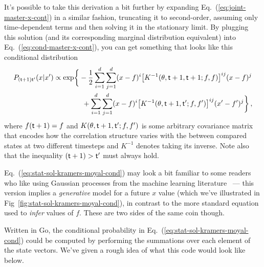 It's possible to take this derivation a bit further by expanding Eq.~(\ref{eq:joint-master-x-cont}) in a similar fashion, truncating it to second-order, assuming only time-dependent terms and then solving it in the stationary limit. By plugging this solution (and its corresponding marginal distribution equivalent) into Eq.~(\ref{eq:cond-master-x-cont}), you can get something that looks like this conditional distribution
\begin{align}
P_{({\sf t}+1){\sf t}'}(x\vert x') &\propto {\rm exp}\bigg\{ -\frac{1}{2}\sum^d_{i=1}\sum^d_{j=1}(x-f)^i \big[K^{-1}(\theta , {\sf t}+1,{\sf t}+1; f,f)\big]^{ij}(x-f)^j \nonumber \\
& \qquad \qquad + \sum^d_{i=1}\sum^d_{j=1}(x-f)^i \big[ K^{-1}(\theta , {\sf t}+1,{\sf t}'; f,f')\big]^{ij}(x'-f')^j  \bigg\} \label{eq:stat-sol-kramers-moyal-cond}\,,
\end{align}
where $f({\sf t}+1)=f$ and $K(\theta , {\sf t}+1,{\sf t}'; f,f')$ is some arbitrary covariance matrix that encodes how the correlation structure varies with the between compared states at two different timesteps and $K^{-1}$ denotes taking its inverse. Note also that the inequality $({\sf t}+1)>{\sf t}'$ must always hold.

Eq.~(\ref{eq:stat-sol-kramers-moyal-cond}) may look a bit familiar to some readers who like using Gaussian processes from the machine learning literature~\cite{murphy2012machine} --- this version implies a \emph{generative} model for a future $x$ value (which we've illustrated in Fig~\ref{fig:stat-sol-kramers-moyal-cond}), in contrast to the more standard equation used to \emph{infer} values of $f$. These are two sides of the same coin though. 

Written in Go, the conditional probability in Eq.~(\ref{eq:stat-sol-kramers-moyal-cond}) could be computed by performing the summations over each element of the state vectors. We've given a rough idea of what this code would look like below.

